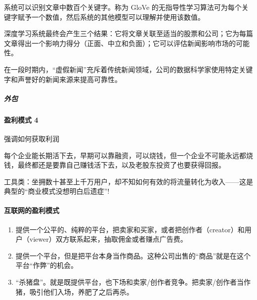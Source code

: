 \documentclass[letterpaper,11pt,english]{sphinxmanual}
\begin{document}
系统可以识别文章中数百个关键字。称为 GloVe
的无指导性学习算法可为每个关键字赋予一个数值，然后系统的其他模型可以理解并使用该数值。

深度学习系统最终会产生三个结果：它将文章关联至适当的股票和公司；它为每篇文章得出一个影响力得分（正面、中立和负面）；它可以评估新闻影响市场的可能性。

在一段时期内，“虚假新闻”充斥着传统新闻领域，公司的数据科学家使用特定关键字和声誉好的新闻来源来提高可靠性。


\subparagraph{外包}
\label{\detokenize{chapter_introduction/money:id6}}


\paragraph{盈利模式 4\sphinxfootnotemark[45]}
\label{\detokenize{chapter_introduction/money:id7}}%
\begin{footnotetext}[45]\sphinxAtStartFootnote
{}
%
\end{footnotetext}\ignorespaces 
强调如何获取利润

每个企业能长期活下去，早期可以靠融资，可以烧钱，但一个企业不可能永远都烧钱，最终都还是要靠自己赚钱活下去，以及老股东投资了也要获得回报。

工具类：坐拥数十甚至上千万用户，却不知如何有效的将流量转化为收入——这是典型的“商业模式没想明白后遗症”!


\paragraph{互联网的盈利模式}
\label{\detokenize{chapter_introduction/money:id8}}
%
\begin{footnote}[46]\sphinxAtStartFootnote
{}
%
\end{footnote}
\begin{enumerate}
%
\item {} 
提供一个公平的、纯粹的平台，把卖家和买家，或者把创作者（creator）和用户（viewer）双方联系起来，抽取佣金或者赚点广告费。

\item {} 
提供一个平台，但是把平台本身当作商品。这种公司出售的“商品”就是在这个平台“作弊”的机会。

\item {} 
“杀猪盘”。就是既提供平台，也下场和卖家/创作者竞争。把卖家/创作者当作猪，吸引他们入场，养肥了之后再杀。

\end{enumerate}
\end{document}
